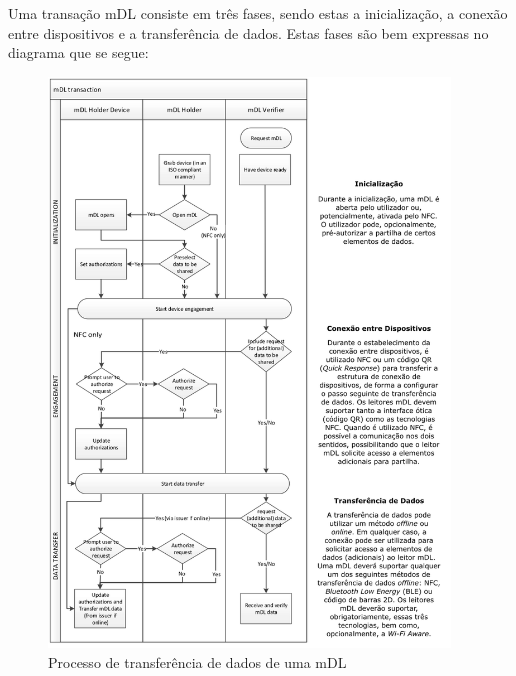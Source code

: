 
Uma transação mDL consiste em três fases, sendo estas a inicialização, a conexão entre dispositivos e a transferência de dados. Estas fases são bem expressas no diagrama que se segue:

\begin{figure}[H]
    \centering
    \includegraphics[width=0.95\textwidth]{./images/mDL_transaction.png}
    \caption{Processo de transferência de dados de uma mDL}
    \label{fig:}
\end{figure}
